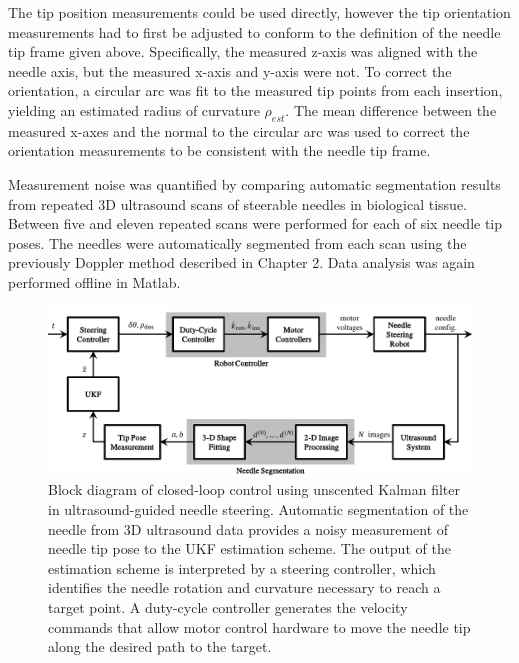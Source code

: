 The tip position measurements could be used directly, however the tip orientation measurements had to first be adjusted to conform to the definition of the needle tip frame given above. Specifically, the measured z-axis was aligned with the needle axis, but the measured x-axis and y-axis were not. To correct the orientation, a circular arc was fit to the measured tip points from each insertion, yielding an estimated radius of curvature $\rho_{est}$. The mean difference between the measured x-axes and the normal to the circular arc was used to correct the orientation measurements to be consistent with the needle tip frame.

Measurement noise was quantified by comparing automatic segmentation results from repeated 3D ultrasound scans of steerable needles in biological tissue. Between five and eleven repeated scans were performed for each of six needle tip poses. The needles were automatically segmented from each scan using the previously Doppler method described in Chapter 2. Data analysis was again performed offline in Matlab.

\begin{figure}[!t]
\centering
\includegraphics[width=\columnwidth]{Images/Chapter4/UKFBlockDiagram/UKFBlockDiagram}%
\caption[Block diagram of closed-loop control algorithm with UKF]{Block diagram of closed-loop control using unscented Kalman filter in ultrasound-guided needle steering. Automatic segmentation of the needle from 3D ultrasound data provides a noisy measurement of needle tip pose to the UKF estimation scheme. The output of the estimation scheme is interpreted by a steering controller, which identifies the needle rotation and curvature necessary to reach a target point. A duty-cycle controller generates the velocity commands that allow motor control hardware to move the needle tip along the desired path to the target.}
\label{fig:UKFBlockDiagram}
\end{figure}

